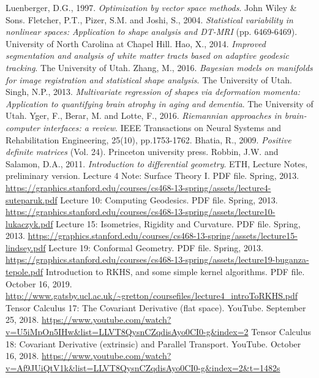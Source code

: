 \documentclass[a4paper]{article}
\theoremstyle{definition}
\theoremstyle{plain}
\begin{document}
\begin{thebibliography}{99} 
Luenberger, D.G., 1997. \textit{Optimization by vector space methods}. John Wiley \& Sons.
Fletcher, P.T., Pizer, S.M. and Joshi, S., 2004. \textit{Statistical variability in nonlinear spaces: Application to shape analysis and DT-MRI} (pp. 6469-6469). University of North Carolina at Chapel Hill.
Hao, X., 2014. \textit{Improved segmentation and analysis of white matter tracts based on adaptive geodesic tracking}. The University of Utah.
Zhang, M., 2016. \textit{Bayesian models on manifolds for image registration and statistical shape analysis}. The University of Utah.
Singh, N.P., 2013. \textit{Multivariate regression of shapes via deformation momenta: Application to quantifying brain atrophy in aging and dementia}. The University of Utah.
Yger, F., Berar, M. and Lotte, F., 2016. \textit{Riemannian approaches in brain-computer interfaces: a review}. IEEE Transactions on Neural Systems and Rehabilitation Engineering, 25(10), pp.1753-1762.
Bhatia, R., 2009. \textit{Positive definite matrices} (Vol. 24). Princeton university press.
Robbin, J.W. and Salamon, D.A., 2011. \textit{Introduction to differential geometry}. ETH, Lecture Notes, preliminary version.
 Lecture 4 Note: Surface Theory I. PDF file. Spring, 2013. \url{https://graphics.stanford.edu/courses/cs468-13-spring/assets/lecture4-suteparuk.pdf}
 Lecture 10: Computing Geodesics. PDF file. Spring, 2013. \url{https://graphics.stanford.edu/courses/cs468-13-spring/assets/lecture10-lukaczyk.pdf}
 Lecture 15: Isometries, Rigidity and Curvature. PDF file. Spring, 2013. \url{https://graphics.stanford.edu/courses/cs468-13-spring/assets/lecture15-lindsey.pdf}
 Lecture 19: Conformal Geometry. PDF file. Spring, 2013. \url{https://graphics.stanford.edu/courses/cs468-13-spring/assets/lecture19-buganza-tepole.pdf}
 Introduction to RKHS, and some simple kernel
algorithms. PDF file. October 16, 2019. \url{http://www.gatsby.ucl.ac.uk/~gretton/coursefiles/lecture4_introToRKHS.pdf}
 Tensor Calculus 17: The Covariant Derivative (flat space). YouTube. September 25, 2018. \url{https://www.youtube.com/watch?v=U5iMpOn5IHw&list=LLVT8QysnCZqdisAyo0CI0-g&index=2}
 Tensor Calculus 18: Covariant Derivative (extrinsic) and Parallel Transport. YouTube. October 16, 2018. \url{https://www.youtube.com/watch?v=Af9JUiQtV1k&list=LLVT8QysnCZqdisAyo0CI0-g&index=2&t=1482s}

\end{thebibliography}
\end{document}
